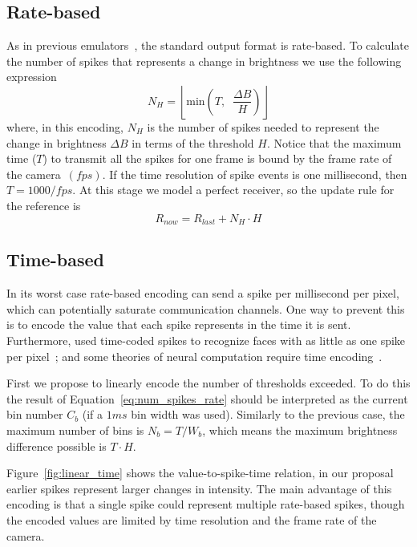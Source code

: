 \documentclass[twocolumn, a4paper]{article}
\begin{document}
\subsection{Rate-based}
As in previous emulators~\cite{dvs_emu}, the standard output format is rate-based. To calculate the number of spikes that represents a change in brightness we use the following expression
\begin{equation}
  \label{eq:num_spikes_rate}
  N_{H} = \left\lfloor \mathrm{min}\left( T, \;\; \frac{\Delta B}{H} \right) \right\rfloor
\end{equation}
where, in this encoding, $N_{H}$ is the number of spikes needed to represent the change in brightness $\Delta B$ in terms of the threshold $H$. Notice that the maximum time ($T$) to transmit all the spikes for one frame is bound by the frame rate of the camera~$(fps)$. If the time resolution of spike events is one millisecond, then $T = 1000/fps$. At this stage we model a perfect receiver, so the update rule for the reference is
\begin{equation}
  \label{eq:ref_update}
  R_{now} = R_{last} + N_{H}\cdot H
\end{equation}

\subsection{Time-based}
In its worst case rate-based encoding can send a spike per millisecond per pixel, which can potentially saturate communication channels. One way to prevent this is to encode the value that each spike represents in the time it is sent. Furthermore, \citeauthor{Delorme2001795} used time-coded spikes to recognize faces with as little as one spike per pixel~\cite{Delorme2001795}; and some theories of neural computation require time encoding~\cite{izhikevich2006polychronization}.

First we propose to linearly encode the number of thresholds exceeded. To do this the result of Equation~\ref{eq:num_spikes_rate} should be interpreted as the current bin number $C_{b}$ (if a $1 ms$ bin width was used). Similarly to the previous case, the maximum number of bins is $N_{b}=T/W_{b}$, which means the maximum brightness difference possible is $T\cdot H$.

Figure~\ref{fig:linear_time} shows the value-to-spike-time relation, in our proposal earlier spikes represent larger changes in intensity. The main advantage of this encoding is that a single spike could represent multiple rate-based spikes, though the encoded values are limited by time resolution and the frame rate of the camera.
\end{document}
